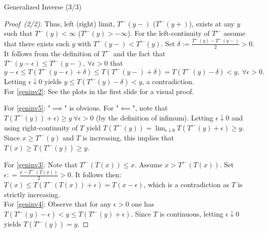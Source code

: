 \documentclass[envcountsect]{beamer}
\theoremstyle{definition}
\theoremstyle{plain}
\newcommand*{\geninv}[1]{#1^{\leftarrow}}
\begin{document}
\begin{frame}{Generalized Inverse (3/3)}
	\begin{proof}[Proof~(2/2)]
		Thus, left (right) limit, $\geninv{T}(y-)$ ($\geninv{T}(y+)$), exists at any $y$ such that $\geninv{T}(y)<\infty$ ($\geninv{T}(y)>-\infty$).
		For the left-continuity of $\geninv{T}$ assume that there exists such $y$ with $\geninv{T}(y-) < \geninv{T}(y)$. Set $\delta:= \frac{\geninv{T}(y)-\geninv{T}(y-)}{2}>0.$ It follows from the definition of $\geninv{T}$ and the fact that $\geninv{T}(y-\epsilon) \le \geninv{T}(y-),\ \forall \epsilon >0$  that
		\begin{equation*}
			y-\epsilon \le T(\geninv{T}(y-\epsilon) + \delta) 
			\le T(\geninv{T}(y-) + \delta) =  T(\geninv{T}(y) - \delta) < y, \ \forall \epsilon >0. 
		\end{equation*}
	 	Letting $\epsilon \downarrow 0$ yields $y \le T(\geninv{T}(y) - \delta) < y$, a contradiction.\\
	 
		For \ref{geninv2}: See the plots in the first slide for a visual proof.
		
		For \ref{geninv5}: "$\implies$" is obvious. For "$\impliedby$", note that $T(\geninv{T}(y)) + \epsilon) \ge y \ \forall \epsilon >0$ (by the definition of infimum). Letting $\epsilon \downarrow 0$ and using right-continuity of $T$ yield $T(\geninv{T}(y)) =\lim_{\epsilon \downarrow 0} T(\geninv{T}(y)+\epsilon) \ge y$. Since $x \ge \geninv{T}(y)$ and $T$ is increasing, this implies that $T(x) \ge T(\geninv{T}(y)) \ge y$.
		
		For \ref{geninv3}: Note that $\geninv{T}(T(x)) \le x$. Assume $x > \geninv{T}(T(x))$. Set $\epsilon: = \frac{x-\geninv{T}(T(x))}{2} >0$. It follows then: $T(x) \le T(\geninv{T}(T(x)) + \epsilon ) = T(x-\epsilon)$, which is a contradiction as $T$ is strictly increasing. \\
		
		For \ref{geninv4}: Observe that for any $\epsilon>0$ one has $ T(\geninv{T}(y)  - \epsilon)<y \le T(\geninv{T}(y)  + \epsilon)$. Since $T$ is continuous, letting $\epsilon \downarrow 0$ yields $T(\geninv{T}(y)) = y$.
	
	\end{proof}
\end{frame}
\end{document}
